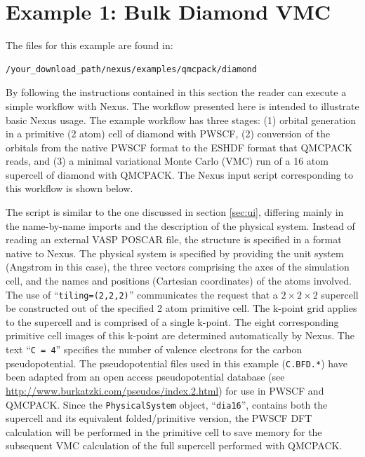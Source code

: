 \documentclass[oneside,11pt]{memoir}
\numberwithin{equation}{section}
\begin{document}
\pagebreak
\section{Example 1: Bulk Diamond VMC}\label{diamond_dmc}
The files for this example are found in:
\begin{shaded}
\begin{verbatim}
/your_download_path/nexus/examples/qmcpack/diamond
\end{verbatim}
\end{shaded}

By following the instructions contained in this section the reader can execute a simple workflow with Nexus.  The workflow presented here is intended to illustrate basic Nexus usage.  The example workflow has three stages: (1) orbital generation in a primitive (2 atom) cell of diamond with PWSCF, (2) conversion of the orbitals from the native PWSCF format to the ESHDF format that QMCPACK reads, and (3) a minimal variational Monte Carlo (VMC) run of a 16 atom supercell of diamond with QMCPACK.  The Nexus input script corresponding to this workflow is shown below.  

The script is similar to the one discussed in section \ref{sec:ui}, differing mainly in the name-by-name imports and the description of the physical system.  Instead of reading an external VASP POSCAR file, the structure is specified in a format native to Nexus.  The physical system is specified by providing the unit system (Angstrom in this case), the three vectors comprising the axes of the simulation cell, and the names and positions (Cartesian coordinates) of the atoms involved.  The use of ``\texttt{tiling=(2,2,2)}'' communicates the request that a $2\times2\times2$ supercell be constructed out of the specified 2 atom primitive cell.  The k-point grid applies to the supercell and is comprised of a single k-point.  The eight corresponding primitive cell images of this k-point are determined automatically by Nexus.  The text ``\texttt{C = 4}'' specifies the number of valence electrons for the carbon pseudopotential.  The pseudopotential files used in this example (\texttt{C.BFD.*}) have been adapted from an open access pseudopotential database (see \url{http://www.burkatzki.com/pseudos/index.2.html}) for use in PWSCF and QMCPACK.  Since the \texttt{PhysicalSystem} object, ``\texttt{dia16}'', contains both the supercell and its equivalent folded/primitive version, the PWSCF DFT calculation will be performed in the primitive cell to save memory for the subsequent VMC calculation of the full supercell performed with QMCPACK.
\end{document}

